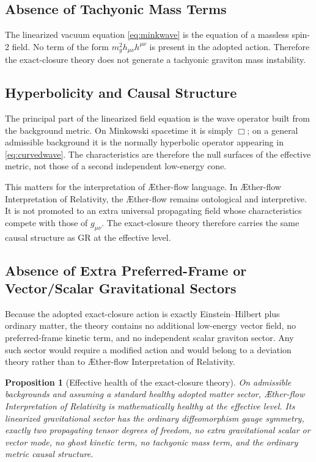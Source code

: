 \documentclass[11pt]{article}
\newcommand{\Aflow}{\AE{}ther-flow}
\newcommand{\TheoryName}{\Aflow{} Interpretation of Relativity}
\newtheorem{proposition}{Proposition}
\begin{document}
\subsection{Absence of Tachyonic Mass Terms}

The linearized vacuum equation \eqref{eq:minkwave} is the equation of a massless spin-2 field. No term of the form \(m_g^2 h_{\mu\nu}h^{\mu\nu}\) is present in the adopted action. Therefore the exact-closure theory does not generate a tachyonic graviton mass instability.

\subsection{Hyperbolicity and Causal Structure}

The principal part of the linearized field equation is the wave operator built from the background metric. On Minkowski spacetime it is simply \(\Box\); on a general admissible background it is the normally hyperbolic operator appearing in \eqref{eq:curvedwave}. The characteristics are therefore the null surfaces of the effective metric, not those of a second independent low-energy cone.

This matters for the interpretation of \Aflow{} language. In \TheoryName{}, the \Aflow{} remains ontological and interpretive. It is not promoted to an extra universal propagating field whose characteristics compete with those of \(g_{\mu\nu}\). The exact-closure theory therefore carries the same causal structure as GR at the effective level.

\subsection{Absence of Extra Preferred-Frame or Vector/Scalar Gravitational Sectors}

Because the adopted exact-closure action is exactly Einstein--Hilbert plus ordinary matter, the theory contains no additional low-energy vector field, no preferred-frame kinetic term, and no independent scalar graviton sector. Any such sector would require a modified action and would belong to a deviation theory rather than to \TheoryName{}.

\begin{proposition}[Effective health of the exact-closure theory]
On admissible backgrounds and assuming a standard healthy adopted matter sector, \TheoryName{} is mathematically healthy at the effective level. Its linearized gravitational sector has the ordinary diffeomorphism gauge symmetry, exactly two propagating tensor degrees of freedom, no extra gravitational scalar or vector mode, no ghost kinetic term, no tachyonic mass term, and the ordinary metric causal structure.
\end{proposition}
\end{document}
